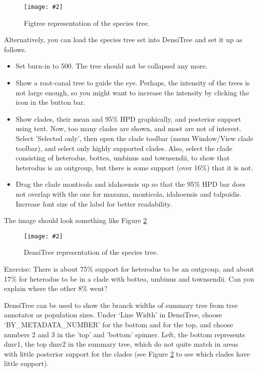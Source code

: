\documentclass{article}
\newcommand{\includeimage}[2][]{%
\texttt{[image: \#2]}
}
\begin{document}
\begin{figure}
\centering
\includeimage[scale=0.4]{figures/figtree}

\caption{\label{fig.figtree} Figtree representation of the species tree.}
\end{figure}


Alternatively, you can load the species tree set into DensiTree and set it up as follows.

\begin{itemize}
\item Set burn-in to 500. The tree should not be collapsed any more.
\item Show a root-canal tree to guide the eye. Perhaps, the intensity of the trees is not large enough, so you might want to increase the intensity by clicking the icon in the button bar.
\item Show clades, their mean and 95\% HPD graphically, and posterior support using text. Now, too many clades are shown, and most are not of interest. Select 'Selected only', then open the clade toolbar (menu Window/View clade toolbar), and select only highly supported clades. Also, select the clade consisting of heterodus, bottea, umbinus and townsendii, to show that heterodus is an outgroup,
but there is some support (over 16\%) that it is not.
\item Drag the clade monticola and idahoensis up so that the 95\% HPD bar does not overlap with the one for mazama, monticola, idahoensis and talpoidis. Increase font size of the label for better readability.
\end{itemize}

The image should look something like Figure \ref{fig.DensiTree}

\begin{figure}
\centering
\includeimage[scale=0.4]{figures/DensiTree}
\caption{\label{fig.DensiTree} DensiTree representation of the species tree.}
\end{figure}

Exercise: There is about 75\% support for heterodus to be an outgroup, and about 17\% for heterodus to be in a clade with bottea, umbinus and townsendii. Can you explain where the other 8\% went?


DensiTree can be used to show the branch widths of summary 
tree from tree annotator as population sizes. 
Under `Line Width' in DensiTree, choose `BY\_METADATA\_NUMBER' for the bottom and for the top,
and choose numbers 2 and 3 in the 'top' and 'bottom' spinner.
Left, the bottom represents dmv1, the top dmv2 in the summary tree, which do not quite match 
in areas with little posterior support for the clades (see Figure \ref{fig.DensiTree} to
see which clades have little support).
\end{document}
